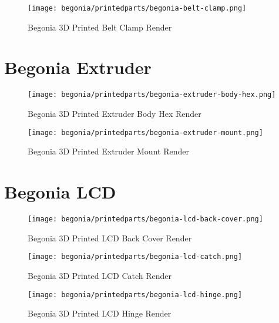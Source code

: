 \begin{figure}[H]
\centering
\texttt{[image: begonia/printedparts/begonia-belt-clamp.png]}
\caption{Begonia 3D Printed Belt Clamp Render}
\label{fig:begbeltclamp}
\end{figure}



\section{Begonia Extruder}

\begin{figure}[H]
\centering
\texttt{[image: begonia/printedparts/begonia-extruder-body-hex.png]}
\caption{Begonia 3D Printed Extruder Body Hex Render}
\label{fig:begextruderbodyhex}
\end{figure}

\begin{figure}[H]
\centering
\texttt{[image: begonia/printedparts/begonia-extruder-mount.png]}
\caption{Begonia 3D Printed Extruder Mount Render}
\label{fig:begextrudermount}
\end{figure}

\section{Begonia LCD}

\begin{figure}[H]
\centering
\texttt{[image: begonia/printedparts/begonia-lcd-back-cover.png]}
\caption{Begonia 3D Printed LCD Back Cover Render}
\label{fig:beglcdbackcover}
\end{figure}

\begin{figure}[H]
\centering
\texttt{[image: begonia/printedparts/begonia-lcd-catch.png]}
\caption{Begonia 3D Printed LCD Catch Render}
\label{fig:beglcdcatch}
\end{figure}

\begin{figure}[H]
\centering
\texttt{[image: begonia/printedparts/begonia-lcd-hinge.png]}
\caption{Begonia 3D Printed LCD Hinge Render}
\label{fig:beglcdhinge}
\end{figure}


